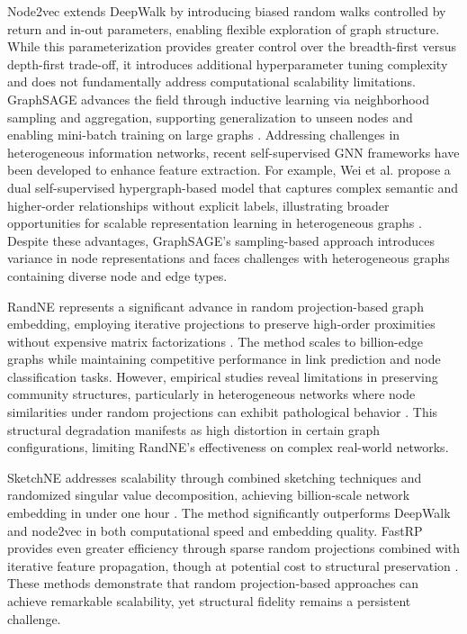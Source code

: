 \documentclass[conference]{IEEEtran}
\begin{document}
Node2vec \cite{grover2016node2vec} extends DeepWalk\cite{perozzi2014} by introducing biased random walks controlled by return and in-out parameters, enabling flexible exploration of graph structure. While this parameterization provides greater control over the breadth-first versus depth-first trade-off, it introduces additional hyperparameter tuning complexity and does not fundamentally address computational scalability limitations. GraphSAGE advances the field through inductive learning via neighborhood sampling and aggregation, supporting generalization to unseen nodes and enabling mini-batch training on large graphs \cite{khemani2024}. Addressing challenges in heterogeneous information networks, recent self-supervised GNN frameworks have been developed to enhance feature extraction. For example, Wei et al. propose a dual self-supervised hypergraph-based model that captures complex semantic and higher-order relationships without explicit labels, illustrating broader opportunities for scalable representation learning in heterogeneous graphs \cite{wei2024self}. Despite these advantages, GraphSAGE's sampling-based approach introduces variance in node representations and faces challenges with heterogeneous graphs containing diverse node and edge types.

RandNE represents a significant advance in random projection-based graph embedding, employing iterative projections to preserve high-order proximities without expensive matrix factorizations \cite{zhang2018randne}. The method scales to billion-edge graphs while maintaining competitive performance in link prediction and node classification tasks. However, empirical studies reveal limitations in preserving community structures, particularly in heterogeneous networks where node similarities under random projections can exhibit pathological behavior \cite{tadic2024}. This structural degradation manifests as high distortion in certain graph configurations, limiting RandNE's effectiveness on complex real-world networks.

SketchNE addresses scalability through combined sketching techniques and randomized singular value decomposition, achieving billion-scale network embedding in under one hour \cite{xie2023sketchne}. The method significantly outperforms DeepWalk and node2vec in both computational speed and embedding quality. FastRP provides even greater efficiency through sparse random projections combined with iterative feature propagation, though at potential cost to structural preservation \cite{chen2019fast}. These methods demonstrate that random projection-based approaches can achieve remarkable scalability, yet structural fidelity remains a persistent challenge.
\end{document}
